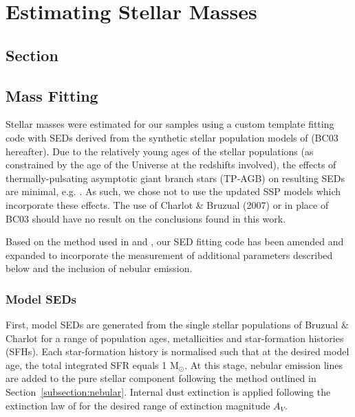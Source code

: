 
\chapter[Stellar Masses and Completeness Simulations]{Estimating Stellar Masses} 
\label{ch:chapter1_label}

\section[Sec]{Section}
\label{sec:section1_label}

\section{Mass Fitting}\label{sec:masses}
Stellar masses were estimated for our samples using a custom template fitting code with SEDs derived from the synthetic stellar population models of \citet{Bruzual:2003ckb} (BC03 hereafter). Due to the relatively young ages of the stellar populations (as constrained by the age of the Universe at the redshifts involved), the effects of thermally-pulsating asymptotic giant branch stars (TP-AGB) on resulting SEDs are minimal, e.g. \citet{2009ApJ...697.1493S}. As such, we chose not to use the updated SSP models which incorporate these effects. The use of Charlot \& Bruzual (2007) or \citet{Maraston:2005er} in place of BC03 should have no result on the conclusions found in this work.

Based on the method used in \citet{Hartley:2013cn} and \citet{Mortlock:2013dg}, our SED fitting code has been amended and expanded to incorporate the measurement of additional parameters described below and the inclusion of nebular emission.

\subsection{Model SEDs}\label{subsec:seds}
First, model SEDs are generated from the single stellar populations of Bruzual \& Charlot for a range of population ages, metallicities and star-formation histories (SFHs).  Each star-formation history is normalised such that at the desired model age, the total integrated SFR equals 1 M$_{\odot}$. At this stage, nebular emission lines are added to the pure stellar component following the method outlined in Section~\ref{subsection:nebular}. Internal dust extinction is applied following the extinction law of \citet{2000ApJ...533..682C} for the desired range of extinction magnitude $A_{V}$. 

